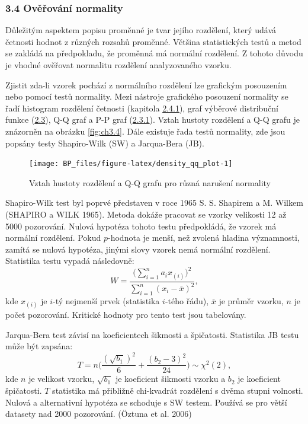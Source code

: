 \documentclass[12pt,]{article}
\begin{document}
\hypertarget{normtests}{\subsubsection{3.4 Ověřování
normality}\label{normtests}}

\qquad Důležitým aspektem popisu proměnné je tvar jejího rozdělení,
který udává četnosti hodnot z různých rozsahů proměnné. Většina
statistických testů a metod se zakládá na předpokladu, že proměnná má
normální rozdělení. Z tohoto důvodu je vhodné ověřovat normalitu
rozdělení analyzovaného vzorku.

\qquad Zjistit zda-li vzorek pochází z normálního rozdělení lze
grafickým posouzením nebo pomocí testů normality. Mezi nástroje
grafického posouzení normality se řadí histogram rozdělení četnosti
(kapitola \protect\hyperlink{hist}{2.4.1}), graf výběrové distribuční
funkce (\protect\hyperlink{distribution}{2.3}), Q-Q graf a P-P graf
(\protect\hyperlink{qqpp}{2.3.1}). Vztah hustoty rozdělení a Q-Q grafu
je znázorněn na obrázku \ref{fig:ch3.4}. Dále existuje řada testů
normality, zde jsou popsány testy Shapiro-Wilk (SW) a Jarqua-Bera (JB).

\begin{figure}[H]

{\centering \texttt{[image: BP\_files/figure-latex/density\_qq\_plot-1]} 

}

\caption{\label{fig:ch3.4} Vztah hustoty rozdělení a Q-Q grafu pro různá narušení normality}\label{fig:density_qq_plot}
\end{figure}

\qquad Shapiro-Wilk test byl poprvé představen v roce 1965 S. S.
Shapirem a M. Wilkem (SHAPIRO a WILK 1965). Metoda dokáže pracovat se
vzorky velikosti 12 až 5000 pozorování. Nulová hypotéza tohoto testu
předpokládá, že vzorek má normální rozdělení. Pokud \(p\)-hodnota je
menší, než zvolená hladina významnosti, zamítá se nulová hypotéza,
jinými slovy vzorek nemá normální rozdělení. Statistika testu vypadá
následovně:
\[W = \frac{\big(\sum \limits^n_{i=1} a_i x_{(i)}\big)^2}{\sum \limits^n_{i=1}(x_i - \bar{x})^2},\]
kde \(x_{(i)}\) je \(i\)-tý nejmenší prvek (statistika \(i\)-tého řádu),
\(\bar{x}\) je průměr vzorku, \(n\) je počet pozorování. Kritické
hodnoty pro tento test jsou tabelovány.

\qquad Jarqua-Bera test závisí na koeficientech šikmosti a špičatosti.
Statistika JB testu může být zapsána:
\[T = n \bigg( \frac{(\sqrt{b_1})^2}{6} + \frac{(b_2 - 3)^2}{24} \bigg) \sim \chi^2(2),\]
kde \(n\) je velikost vzorku, \(\sqrt{b_1}\) je koeficient šikmosti
vzorku a \(b_2\) je koeficient špičatosti. \(T\) statistika má přibližně
chi-kvadrát rozdělení s dvěma stupni volnosti. Nulová a alternativní
hypotéza se schoduje s SW testem. Používá se pro větší datasety nad 2000
pozorování. (Öztuna et al. 2006)
\end{document}
